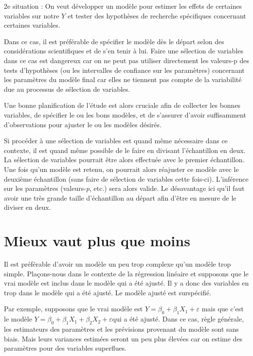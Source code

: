 \documentclass[
]{book}
\theoremstyle{definition}
\theoremstyle{definition}
\theoremstyle{definition}
\theoremstyle{remark}
\begin{document}
2e situation : On veut développer un modèle pour estimer les effets de certaines variables sur notre \(Y\) et tester des hypothèses de recherche spécifiques concernant certaines variables.

Dans ce cas, il est préférable de spécifier le modèle dès le départ selon des considérations scientifiques et de s'en tenir à lui. Faire une sélection de variables dans ce cas est dangereux car on ne peut pas utiliser directement les valeurs-p des tests d'hypothèses (ou les intervalles de confiance sur les paramètres) concernant les paramètres du modèle final car elles ne tiennent pas compte de la variabilité due au processus de sélection de variables.

Une bonne planification de l'étude est alors cruciale afin de collecter les bonnes variables, de spécifier le ou les bons modèles, et de s'assurer d'avoir suffisamment d'observations pour ajuster le ou les modèles désirés.

Si procéder à une sélection de variables est quand même nécessaire dans ce contexte, il est quand même possible de le faire en divisant l'échantillon en deux. La sélection de variables pourrait être alors effectuée avec le premier échantillon. Une fois qu'un modèle est retenu, on pourrait alors réajuster ce modèle avec le deuxième échantillon (sans faire de sélection de variables cette fois-ci). L'inférence sur les paramètres (valeurs-\emph{p}, etc.) sera alors valide. Le désavantage ici qu'il faut avoir une très grande taille d'échantillon au départ afin d'être en mesure de le diviser en deux.

\hypertarget{mieux-vaut-plus-que-moins}{%
\section{Mieux vaut plus que moins}\label{mieux-vaut-plus-que-moins}}

Il est préférable d'avoir un modèle un peu trop complexe qu'un modèle trop simple. Plaçons-nous dans le contexte de la régression linéaire et supposons que le vrai modèle est inclus dans le modèle qui a été ajusté. Il y a donc des variables en trop dans le modèle qui a été ajusté. Le modèle ajusté est surspécifié.

Par exemple, supposons que le vrai modèle est \(Y=\beta_0+\beta_1X_1+\varepsilon\) mais que c'est le modèle \(Y=\beta_0+\beta_1X_1+\beta_2X_2+\varepsilon\)qui a été ajusté. Dans ce cas, règle générale, les estimateurs des paramètres et les prévisions provenant du modèle sont sans biais. Mais leurs variances estimées seront un peu plus élevées car on estime des paramètres pour des variables superflues.
\end{document}
